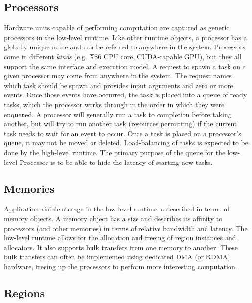 \subsection{Processors}

Hardware units capable of performing computation are captured as generic
processors in the low-level runtime.  Like other runtime objects, a processor
has a globally unique name and can be referred to anywhere in the system.
Processors come in different \emph{kinds} (e.g. X86 CPU core, CUDA-capable GPU),
but they all support the same
interface and execution model.  A request to spawn a task on a given processor
may come from anywhere in the system.  The request names which task should
be spawn and provides input arguments and zero or more events.  Once those
events have occurred, the task is placed into a queue of ready tasks, which
the processor works through in the order in which they were enqueued.  A
processor will generally run a task to completion before taking another, but
will try to run another task (resources permitting) if the current task needs
to wait for an event to occur.  Once a task is placed on a processor's queue,
it may not be moved or deleted.  Load-balancing of tasks is expected to be done
by the high-level runtime.  The primary purpose of the queue for the low-level
Processor is to be able to hide the latency of starting new tasks.

\subsection{Memories}

Application-visible storage in the low-level runtime is described in terms of
memory objects.  A memory object has a size and describes its affinity to 
processors (and other memories) in terms of relative bandwidth and latency.
The low-level runtime allows for the allocation and freeing of region instances
and allocators.  It also supports bulk transfers from one memory to another.
These bulk transfers can often be implemented using dedicated DMA (or RDMA)
hardware, freeing up the processors to perform more interesting
computation. 

\subsection{Regions}

